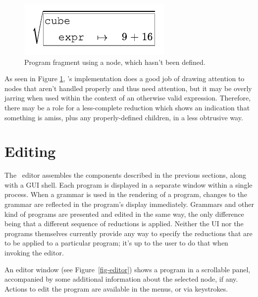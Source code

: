 \begin{figure}[h]
  \begin{center}
  \includegraphics{src/image/gen.pdf}
  \end{center}
  \caption{Program fragment using a  node, which hasn't been defined.}
  \label{fig-general}
\end{figure}

As seen in Figure \ref{fig-general}, \Meta's implementation does a good job of drawing attention to nodes that aren't handled properly and thus need attention, but it may be overly jarring when used within the context of an otherwise valid expression. Therefore, there may be a role for a less-complete reduction which shows an indication that something is amiss, plus any properly-defined children, in a less obtrusive way.


%
%
\section{Editing}
The \Meta\ editor assembles the components described in the previous sections, along with a GUI shell. Each program is displayed in a separate window within a single process. When a grammar is used in the rendering of a program, changes to the grammar are reflected in the program's display immediately. Grammars and other kind of programs are presented and edited in the same way, the only difference being that a different sequence of reductions is applied. Neither the UI nor the programs themselves currently provide any way to specify the reductions that are to be applied to a particular program; it's up to the user to do that when invoking the editor.

An editor window (see Figure\ \ref{fig-editor}) shows a program in a scrollable panel, accompanied by some additional information about the selected node, if any. Actions to edit the program are available in the menus, or via keystrokes.

